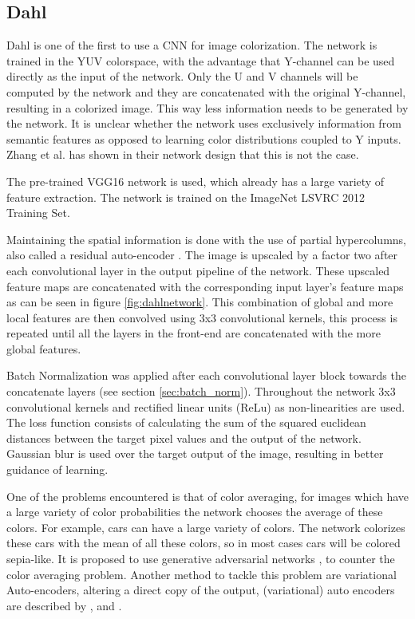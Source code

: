 \subsection{Dahl}

Dahl \cite{Dahl} is one of the first to use a CNN for image colorization. The network is trained in the YUV colorspace, with the advantage that Y-channel can be used directly as the input of the network. Only the U and V channels will be computed by the network and they are concatenated with the original Y-channel, resulting in a colorized image. This way less information needs to be generated by the network. It is unclear whether the network uses exclusively information from semantic features as opposed to learning color distributions coupled to Y inputs. Zhang et al. \cite{Zhang} has shown in their network design that this is not the case. 

The pre-trained VGG16 network is used, which already has a large variety of feature extraction. The network is trained on the ImageNet LSVRC 2012 Training Set. 

Maintaining the spatial information is done with the use of partial hypercolumns, also called a residual auto-encoder \cite{hariharan2015hypercolumns}. The image is upscaled by a factor two after each convolutional layer in the output pipeline of the network. These upscaled feature maps are concatenated with the corresponding input layer's feature maps as can be seen in figure \ref{fig:dahlnetwork}. This combination of global and more local features are then convolved using 3x3 convolutional kernels, this process is repeated until all the layers in the front-end are concatenated with the more global features. 

Batch Normalization was applied after each convolutional layer block towards the concatenate layers (see section \ref{sec:batch_norm}). 
Throughout the network 3x3 convolutional kernels and rectified linear units (ReLu) \cite{nair2010rectified} as non-linearities are used. The loss function consists of calculating the sum of the squared euclidean distances between the target pixel values and the output of the network. 
Gaussian blur is used over the target output of the image, resulting in better guidance of learning. 

One of the problems encountered is that of color averaging, for images which have a large variety of color probabilities the network chooses the average of these colors. For example, cars can have a large variety of colors. 
The network colorizes these cars with the mean of all these colors, so in most cases cars will be colored sepia-like. It is proposed to use generative adversarial networks \cite{Radford}, to counter the color averaging problem. 
Another method to tackle this problem are variational Auto-encoders, altering a direct copy of the output, (variational) auto encoders are described by \cite{Gregor}, \cite{Kingma} and \cite{GoodfellowBOOK}. 


